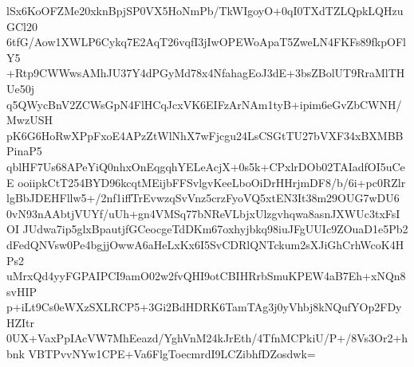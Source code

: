 lSx6KoOFZMe20xknBpjSP0VX5HoNmPb/TkWIgoyO+0qI0TXdTZLQpkLQHzuGCl20
6tfG/Aow1XWLP6Cykq7E2AqT26vqfI3jIwOPEWoApaT5ZweLN4FKFs89fkpOFlY5
+Rtp9CWWwsAMhJU37Y4dPGyMd78x4NfahagEoJ3dE+3bsZBolUT9RraMlTHUe50j
q5QWycBnV2ZCWsGpN4FlHCqJcxVK6EIFzArNAm1tyB+ipim6eGvZbCWNH/MwzUSH
pK6G6HoRwXPpFxoE4APzZtWlNhX7wFjcgu24LsCSGtTU27bVXF34xBXMBBPinaP5
qblHF7Us68APeYiQ0nhxOnEqgqhYELeAcjX+0s5k+CPxlrDOb02TAIadfOI5uCeE
ooiipkCtT254BYD96kcqtMEijbFFSvlgvKeeLboOiDrHHrjmDF8/b/6i+pc0RZlr
lgBbJDEHFllw5+/2nf1iffTrEvwzqSvVnz5crzFyoVQ5xtEN3It38m29OUG7wDU6
0vN93nAAbtjVUYf/uUh+gn4VMSq77bNReVLbjxUlzgvhqwa8asnJXWUc3txFsIOI
JUdwa7ip5glxBpautjfGCeocgeTdDKm67oxhyjbkq98iuJFgUUIc9ZOuaD1e5Pb2
dFedQNVsw0Pe4bgjjOwwA6aHeLxKx6I5SvCDRlQNTckum2sXJiGhCrhWcoK4HPs2
uMrxQd4yyFGPAIPCI9amO02w2fvQHI9otCBIHRrbSmuKPEW4aB7Eh+xNQn8svHIP
p+iLt9Cs0eWXzSXLRCP5+3Gi2BdHDRK6TamTAg3j0yVhbj8kNQufYOp2FDyHZItr
0UX+VaxPpIAcVW7MhEeazd/YghVnM24kJrEth/4TfnMCPkiU/P+/8Vs3Or2+hbnk
VBTPvvNYw1CPE+Va6FlgToecmrdI9LCZibhfDZosdwk=
